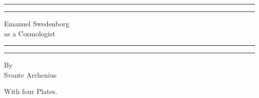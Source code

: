 \documentclass[a4paper, 11pt, oneside, polutonikogreek, english]{article}
\begin{document}
\renewcommand\thefootnote{{\bfseries\color{SkyBlue}{\arabic{footnote}}}}
\let\oldfootnote\footnote
    \renewcommand{\footnote}[1]{\oldfootnote{{\normalsize\bfseries\color{SkyBlue}#1}}}
\begin{titlepage} %
	\centering %
	\scshape %

	
	\rule{\textwidth}{1.6pt}\vspace*{-\baselineskip}\vspace*{2pt} %
	\rule{\textwidth}{0.4pt} %
	
	\vspace{0.75\baselineskip} %

        {\Huge Emanuel Swedenborg \\as a Cosmologist \\} %
	
	\vspace{0.75\baselineskip} %
	
	\rule{\textwidth}{0.4pt}\vspace*{-\baselineskip}\vspace{3.2pt} %
	\rule{\textwidth}{1.6pt} %
	
	\vspace{1\baselineskip} %
	
	
	{By \\\Large Svante Arrhenius\\} %
	
	\vspace*{1\baselineskip} %
	

        {\small With four Plates.}
 
	

\end{titlepage}
\end{document}
